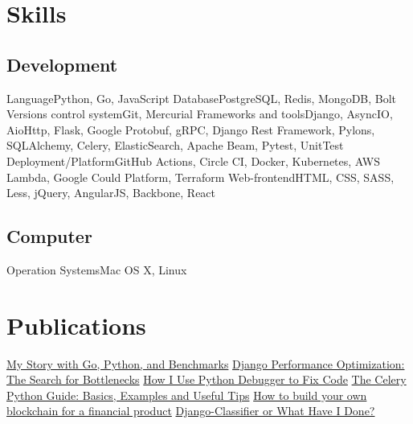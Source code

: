 \documentclass[11pt,a4paper,oneside]{moderncv}
\begin{document}
    \maketitle

    \section{Skills}
        \subsection{Development}
            \cvline
                {Language}{Python, Go, JavaScript}
            \cvline
                {Database}{PostgreSQL, Redis, MongoDB, Bolt}
            \cvline
                {Versions control system}{Git, Mercurial}
            \cvline
                {Frameworks and tools}{Django, AsyncIO, AioHttp, Flask, Google Protobuf, gRPC, Django Rest Framework, Pylons, SQLAlchemy, Celery, ElasticSearch, Apache Beam, Pytest, UnitTest}
            \cvline
                {Deployment/Platform}{GitHub Actions, Circle CI, Docker, Kubernetes, AWS Lambda, Google Could Platform, Terraform}
            \cvline
                {Web-frontend}{HTML, CSS, SASS, Less, jQuery, AngularJS, Backbone, React}

        \subsection{Computer}
            \cvline
                {Operation Systems}{Mac OS X, Linux}

    \section{Publications}
        \cvlistitem
            {\href{https://djangostars.com/blog/my-story-with-golang/}{My Story with Go, Python, and Benchmarks}}
        \cvlistitem
            {\href{https://medium.com/free-code-camp/django-performance-optimization-looking-for-the-bottlenecks-8583789e341b}{Django Performance Optimization: The Search for Bottlenecks}}
        \cvlistitem
            {\href{https://codeburst.io/how-i-use-python-debugger-to-fix-code-279f11f75866}{How I Use Python Debugger to Fix Code}}
        \cvlistitem
            {\href{https://codeburst.io/the-celery-python-guide-basics-examples-and-useful-tips-d8da1fcfaea3}{The Celery Python Guide: Basics, Examples and Useful Tips}}
        \cvlistitem
            {\href{https://djangostars.com/blog/how-to-build-your-own-blockchain-for-a-financial-product/}{How to build your own blockchain for a financial product}}
        \cvlistitem
            {\href{https://medium.com/free-code-camp/django-classifier-or-what-have-i-done-4a8164358c09}{Django-Classifier or What Have I Done?}}
\end{document}
